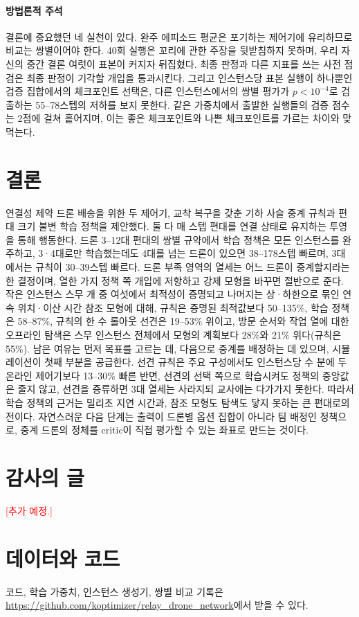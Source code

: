 \documentclass[final,5p,times,twocolumn]{elsarticle}
\newcommand{\pending}[1]{\textcolor{red}{[#1]}}
\begin{document}
\paragraph{방법론적 주석}
결론에 중요했던 네 실천이 있다. 완주 에피소드 평균은 포기하는 제어기에 유리하므로 비교는 쌍별이어야
한다. 40회 실행은 꼬리에 관한 주장을 뒷받침하지 못하며, 우리 자신의 중간 결론 여럿이 표본이 커지자
뒤집혔다. 최종 판정과 다른 지표를 쓰는 사전 점검은 최종 판정이 기각할 개입을 통과시킨다. 그리고
인스턴스당 표본 실행이 하나뿐인 검증 집합에서의 체크포인트 선택은, 다른 인스턴스에서의 쌍별 평가가
$p < 10^{-4}$로 검출하는 55--78스텝의 저하를 보지 못한다. 같은 가중치에서 출발한 실행들의 검증
점수는 2점에 걸쳐 흩어지며, 이는 좋은 체크포인트와 나쁜 체크포인트를 가르는 차이와 맞먹는다.

\section{결론}
\label{sec:conclusion}

연결성 제약 드론 배송을 위한 두 제어기, 교착 복구을 갖춘 기하 사슬 중계 규칙과 편대 크기 불변
학습 정책을 제안했다. 둘 다 매 스텝 편대를 연결 상태로 유지하는 투영을 통해 행동한다. 드론 3--12대
편대의 쌍별 규약에서 학습 정책은 모든 인스턴스를 완주하고, 3·4대로만 학습했는데도 4대를 넘는
드론이 있으면 38--178스텝 빠르며, 3대에서는 규칙이 30--39스텝 빠르다. 드론 부족 영역의 열세는 어느 드론이 중계할지라는
한 결정이며, 열한 가지 정책 쪽 개입에 저항하고 강제 모형을 바꾸면 절반으로 준다. 작은 인스턴스 스무 개
중 여섯에서 최적성이 증명되고 나머지는 상·하한으로 묶인 연속 위치·이산 시간 참조 모형에 대해, 규칙은 증명된
최적값보다 50--135\%, 학습 정책은 58--87\%, 규칙의 한 수 롤아웃 선견은 19--53\% 위이고, 방문 순서와 작업
열에 대한 오프라인 탐색은 스무 인스턴스 전체에서 모형의 계획보다 28\%와 21\% 위다(규칙은 55\%). 남은 여유는 먼저 목표를
고르는 데, 다음으로 중계를 배정하는 데 있으며, 시뮬레이션이 첫째 부분을 공급한다. 선견 규칙은 주요
구성에서도 인스턴스당 수 분에 두 온라인 제어기보다 13--30\% 빠른 반면, 선견의 선택 쪽으로 학습시켜도
정책의 중앙값은 줄지 않고, 선견을 증류하면 3대 열세는 사라지되 교사에는 다가가지 못한다. 따라서 학습
정책의 근거는 밀리초 지연 시간과, 참조 모형도 탐색도 닿지 못하는 큰 편대로의 전이다. 자연스러운 다음
단계는 출력이 드론별 옵션 집합이 아니라 팀 배정인 정책으로, 중계 드론의 정체를 critic이 직접 평가할 수
있는 좌표로 만드는 것이다.

\section*{감사의 글}
\pending{추가 예정.}

\section*{데이터와 코드}
코드, 학습 가중치, 인스턴스 생성기, 쌍별 비교 기록은
\url{https://github.com/koptimizer/relay_drone_network}에서 받을 수 있다.



\end{document}
